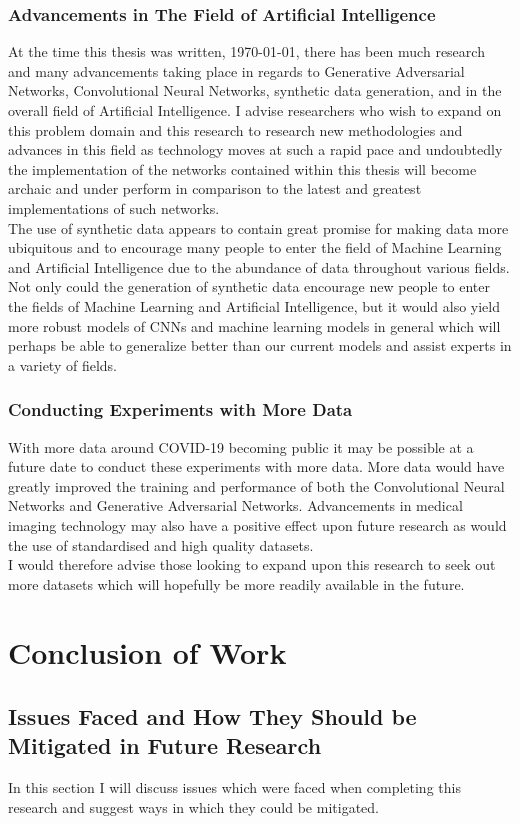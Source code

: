\subsubsection{Advancements in The Field of Artificial Intelligence}
At the time this thesis was written, \today, there has been much research and many advancements taking place in regards to Generative Adversarial Networks, Convolutional Neural Networks, synthetic data generation, and in the overall field of Artificial Intelligence.  I advise researchers who wish to expand on this problem domain and this research to research new methodologies and advances in this field as technology moves at such a rapid pace and undoubtedly the implementation of the networks contained within this thesis will become archaic and under perform in comparison to the latest and greatest implementations of such networks.
\\
The use of synthetic data appears to contain great promise for making data more ubiquitous and to encourage many people to enter the field of Machine Learning and Artificial Intelligence due to the abundance of data throughout various fields.  Not only could the generation of synthetic data encourage new people to enter the fields of Machine Learning and Artificial Intelligence, but it would also yield more robust models of CNNs and machine learning models in general which will perhaps be able to generalize better than our current models and assist experts in a variety of fields.
\subsubsection{Conducting Experiments with More Data}
With more data around COVID-19 becoming public it may be possible at a future date to conduct these experiments with more data.  More data would have greatly improved the training and performance of both the Convolutional Neural Networks and Generative Adversarial Networks.  Advancements in medical imaging technology may also have a positive effect upon future research as would the use of standardised and high quality datasets.  
\\
I would therefore advise those looking to expand upon this research to seek out more datasets which will hopefully be more readily available in the future. 
\section{Conclusion of Work}
\subsection{Issues Faced and How They Should be Mitigated in Future Research}
In this section I will discuss issues which were faced when completing this research and suggest ways in which they could be mitigated.
